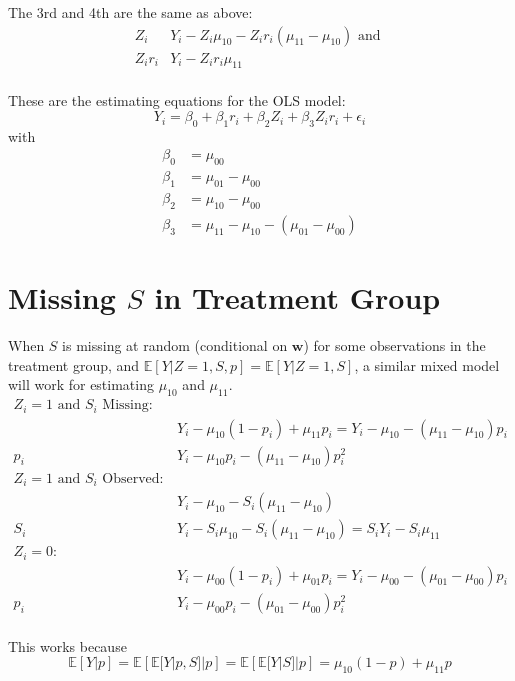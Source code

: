 \documentclass[11pt]{article} %
\begin{document}
The 3rd and 4th are the same as above:
\begin{align*}
  Z_i&Y_i-Z_i\mu_{10}-Z_ir_i(\mu_{11}-\mu_{10})\text{ and }\\
  Z_ir_i&Y_i-Z_ir_i\mu_{11}\\
\end{align*}

These are the estimating equations for the OLS model:
\begin{equation}\label{eq:regression0}
  Y_i=\beta_0+\beta_1r_i+\beta_2Z_i+\beta_3Z_ir_i+\epsilon_i
\end{equation}
with
\begin{align*}
  \beta_0&=\mu_{00}\\
  \beta_1&=\mu_{01}-\mu_{00}\\
  \beta_2&=\mu_{10}-\mu_{00}\\
  \beta_3&=\mu_{11}-\mu_{10}-(\mu_{01}-\mu_{00})
\end{align*}

\section{Missing $S$ in Treatment Group}
When $S$ is missing at random (conditional on $\bm{w}$) for some observations in the treatment group,
and $\mathbb{E}[Y|Z=1,S,p]=\mathbb{E}[Y|Z=1,S]$,
a similar mixed model will work for estimating $\mu_{10}$ and $\mu_{11}$.
\begin{align*}
  Z_i=1\text{ and }S_i\text{ Missing}:&\\
  &Y_i-\mu_{10}(1-p_i)+\mu_{11}p_i=Y_i-\mu_{10}-(\mu_{11}-\mu_{10})p_i\\
  p_i&Y_i-\mu_{10}p_i-(\mu_{11}-\mu_{10})p_i^2\\
  Z_i=1\text{ and }S_i\text{ Observed}:&\\
        &Y_i-\mu_{10}-S_i(\mu_{11}-\mu_{10})\\
  S_i&Y_i-S_i\mu_{10}-S_i(\mu_{11}-\mu_{10})=S_iY_i-S_i\mu_{11}\\
    Z_i=0:&\\
  &Y_i-\mu_{00}(1-p_i)+\mu_{01}p_i=Y_i-\mu_{00}-(\mu_{01}-\mu_{00})p_i\\
  p_i&Y_i-\mu_{00}p_i-(\mu_{01}-\mu_{00})p_i^2\\
\end{align*}

This works because
\begin{equation*}
  \mathbb{E}[Y|p]=\mathbb{E}\left[\mathbb{E}[Y|p,S]|p\right]=\mathbb{E}\left[\mathbb{E}[Y|S]|p\right]=\mu_{10}(1-p)+\mu_{11}p
\end{equation*}
\end{document}
